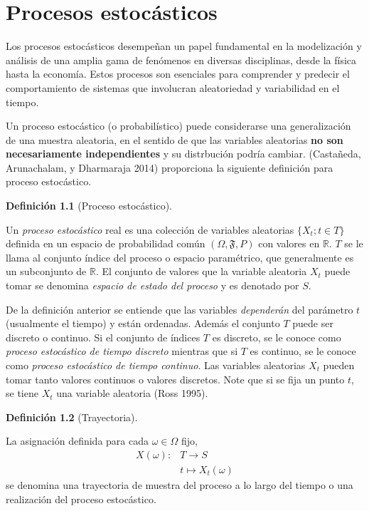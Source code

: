 \documentclass[
  us-letterpaper,
]{scrreprt}
\theoremstyle{definition}
\theoremstyle{plain}
\theoremstyle{plain}
\theoremstyle{definition}
\newtheorem{definition}{Definición}[chapter]
\theoremstyle{remark}
\begin{document}
\chapter{Procesos estocásticos}\label{procesos-estocuxe1sticos}

Los procesos estocásticos desempeñan un papel fundamental en la
modelización y análisis de una amplia gama de fenómenos en diversas
disciplinas, desde la física hasta la economía. Estos procesos son
esenciales para comprender y predecir el comportamiento de sistemas que
involucran aleatoriedad y variabilidad en el tiempo.

Un proceso estocástico (o probabilístico) puede considerarse una
generalización de una muestra aleatoria, en el sentido de que las
variables aleatorias \textbf{no son necesariamente independientes} y su
distrbución podría cambiar. (Castañeda, Arunachalam, y Dharmaraja 2014)
proporciona la siguiente definición para proceso estocástico.

\begin{definition}[Proceso
estocástico]\protect\hypertarget{def-PE}{}\label{def-PE}

Un \emph{proceso estocástico} real es una colección de variables
aleatorias \(\{X_t; t\in T\}\) definida en un espacio de probabilidad
común \((\Omega, \mathfrak{F}, P)\) con valores en \(\mathbb{R}\). \(T\)
se le llama al conjunto índice del proceso o espacio paramétrico, que
generalmente es un subconjunto de \(\mathbb R\). El conjunto de valores
que la variable aleatoria \(X_t\) puede tomar se denomina \emph{espacio
de estado del proceso} y es denotado por \(S\).

\end{definition}

De la definición anterior se entiende que las variables
\emph{dependerán} del parámetro \(t\) (usualmente el tiempo) y están
ordenadas. Además el conjunto \(T\) puede ser discreto o continuo. Si el
conjunto de índices \(T\) es discreto, se le conoce como \emph{proceso
estocástico de tiempo discreto} mientras que si \(T\) es continuo, se le
conoce como \emph{proceso estocástico de tiempo continuo}. Las variables
aleatorias \(X_t\) pueden tomar tanto valores continuos o valores
discretos. Note que si se fija un punto \(t\), se tiene \(X_t\) una
variable aleatoria (Ross 1995).

\begin{definition}[Trayectoria]\protect\hypertarget{def-realiza}{}\label{def-realiza}

La asignación definida para cada \(\omega\in\Omega\) fijo,
\[\begin{split}X(\omega): & T\to S\\ &t\mapsto X_t(\omega)\end{split}\]
se denomina una trayectoria de muestra del proceso a lo largo del tiempo
o una realización del proceso estocástico.

\end{definition}
\end{document}
